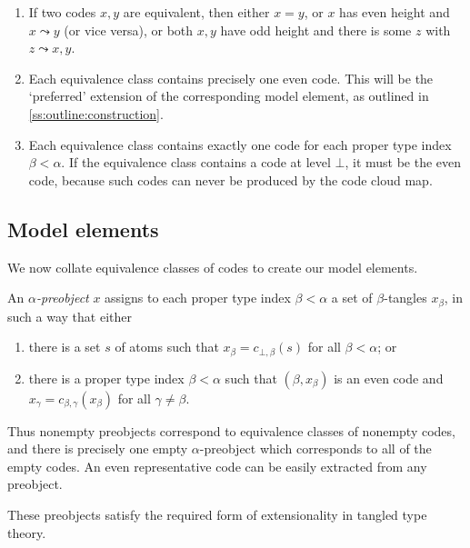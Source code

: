 \begin{remarks}
    \begin{enumerate}
        \item If two codes \( x, y \) are equivalent, then either \( x = y \), or \( x \) has even height and \( x \rightcurvedarrow y \) (or vice versa), or both \( x, y \) have odd height and there is some \( z \) with \( z \rightcurvedarrow x, y \).
        \item Each equivalence class contains precisely one even code.
        This will be the `preferred' extension of the corresponding model element, as outlined in \cref{ss:outline:construction}.
        \item Each equivalence class contains exactly one code for each proper type index \( \beta < \alpha \).
        If the equivalence class contains a code at level \( \bot \), it must be the even code, because such codes can never be produced by the code cloud map.
    \end{enumerate}
\end{remarks}

\subsection{Model elements}

We now collate equivalence classes of codes to create our model elements.

\begin{definition}
    An \emph{\( \alpha \)-preobject} \( x \) assigns to each proper type index \( \beta < \alpha \) a set of \( \beta \)-tangles \( x_\beta \), in such a way that either
    \begin{enumerate}
        \item there is a set \( s \) of atoms such that \( x_\beta = c_{\bot,\beta}(s) \) for all \( \beta < \alpha \); or
        \item there is a proper type index \( \beta < \alpha \) such that \( (\beta, x_\beta) \) is an even code and \( x_\gamma = c_{\beta,\gamma}(x_\beta) \) for all \( \gamma \neq \beta \).
    \end{enumerate}
    Thus nonempty preobjects correspond to equivalence classes of nonempty codes, and there is precisely one empty \( \alpha \)-preobject which corresponds to all of the empty codes.
    An even representative code can be easily extracted from any preobject.
\end{definition}

These preobjects satisfy the required form of extensionality in tangled type theory.

